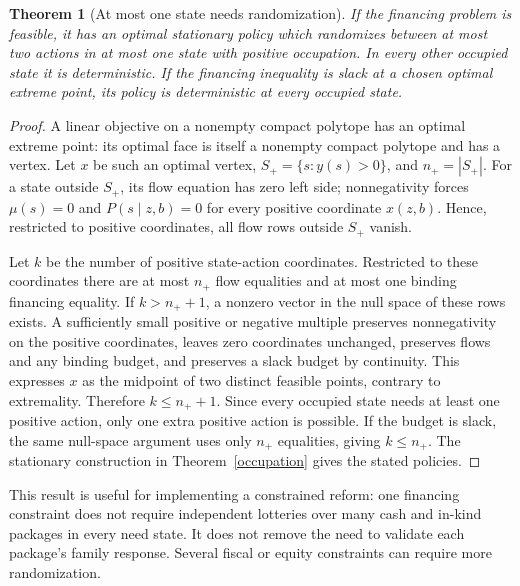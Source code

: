 \documentclass[11pt]{article}
\newtheorem{theorem}{Theorem}
\theoremstyle{remark}
\begin{document}
\begin{theorem}[At most one state needs randomization]\label{one}
If the financing problem is feasible, it has an optimal stationary policy which randomizes between at most two actions in at most one state with positive occupation. In every other occupied state it is deterministic. If the financing inequality is slack at a chosen optimal extreme point, its policy is deterministic at every occupied state.
\end{theorem}
\begin{proof}
A linear objective on a nonempty compact polytope has an optimal extreme point: its optimal face is itself a nonempty compact polytope and has a vertex. Let $x$ be such an optimal vertex, $S_+=\{s:y(s)>0\}$, and $n_+=|S_+|$. For a state outside $S_+$, its flow equation has zero left side; nonnegativity forces $\mu(s)=0$ and $P(s\mid z,b)=0$ for every positive coordinate $x(z,b)$. Hence, restricted to positive coordinates, all flow rows outside $S_+$ vanish.

Let $k$ be the number of positive state-action coordinates. Restricted to these coordinates there are at most $n_+$ flow equalities and at most one binding financing equality. If $k>n_++1$, a nonzero vector in the null space of these rows exists. A sufficiently small positive or negative multiple preserves nonnegativity on the positive coordinates, leaves zero coordinates unchanged, preserves flows and any binding budget, and preserves a slack budget by continuity. This expresses $x$ as the midpoint of two distinct feasible points, contrary to extremality. Therefore $k\leq n_++1$. Since every occupied state needs at least one positive action, only one extra positive action is possible. If the budget is slack, the same null-space argument uses only $n_+$ equalities, giving $k\leq n_+$. The stationary construction in Theorem~\ref{occupation} gives the stated policies.
\end{proof}

This result is useful for implementing a constrained reform: one financing constraint does not require independent lotteries over many cash and in-kind packages in every need state. It does not remove the need to validate each package's family response. Several fiscal or equity constraints can require more randomization.
\end{document}
